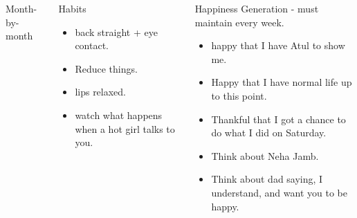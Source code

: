 \documentclass[serif, mathserif, final]{beamer}
\begin{document}
{\begin{frame} {}
\begin{columns}
\begin{column}
\begin{block}{ Month-by-month}
\begin{itemize}
\end{itemize}
\end{block}
\end{column} %


\begin{block}{Habits} 
  \begin{itemize} 
    \tiny \item \tiny back straight + eye contact. 
  \item \tiny Reduce things. 
  \item \tiny lips relaxed. 
  \item \tiny watch what happens when a hot girl talks to you. 
  \end{itemize} 
\end{block} 

\begin{block}{Happiness Generation - must maintain every week.}
\begin{itemize}
  \tiny \item \tiny happy that I have Atul to show me.  
  \item \tiny Happy that I have normal life up to this point.  
  \item \tiny Thankful that I got a chance to do what I did on Saturday. 
  \item \tiny Think about Neha Jamb. 
\item \tiny Think about dad saying, I understand, and want you to be
  happy. 
\end{itemize}
\end{block}


\end{columns}
\end{frame}}
\end{document}
